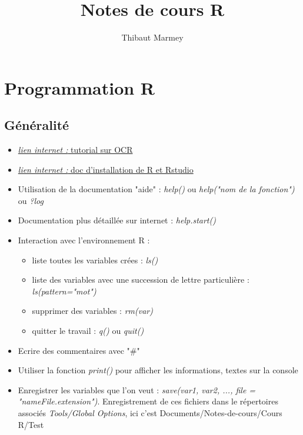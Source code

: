 \documentclass[12pt,a4paper]{article}
\author{Thibaut Marmey}
\title{Notes de cours R}
\begin{document}
	\maketitle

\begin{normalsize}
\tableofcontents
\end{normalsize}

\section{Programmation R}
\subsection{Généralité}
\begin{itemize}
\item \href{https://openclassrooms.com/fr/courses/1393696-effectuez-vos-etudes-statistiques-avec-r}{\textit{lien internet : }tutorial sur OCR}
\item \href{https://linuxconfig.org/rstudio-on-ubuntu-18-04-bionic-beaver-linux}{\textit{lien internet : }doc d'installation de R et Rstudio}
\item Utilisation de la documentation "aide" : \textit{help()} ou \textit{help("nom de la fonction")} ou  \textit{?log}
\item Documentation plus détaillée sur internet : \textit{help.start()}
\item Interaction avec l'environnement R :
\begin{itemize}
\item liste toutes les variables crées : \textit{ls()}
\item liste des variables avec une succession de lettre particulière : \textit{ls(pattern="mot")}
\item supprimer des variables : \textit{rm(var)}
\item quitter le travail : \textit{q()} ou \textit{quit()}
\end{itemize}
\item Ecrire des commentaires avec "\#"
\item Utiliser la fonction \textit{print()} pour afficher les informations, textes sur la console
\item Enregistrer les variables que l'on veut : 
\newline \textit{save(var1, var2, ..., file = "nameFile.extension")}.
\newline Enregistrement de ces fichiers dans le répertoires associés \textit{Tools/Global Options}, ici c'est Documents/Notes-de-cours/Cours R/Test
\end{itemize}
\end{document}
